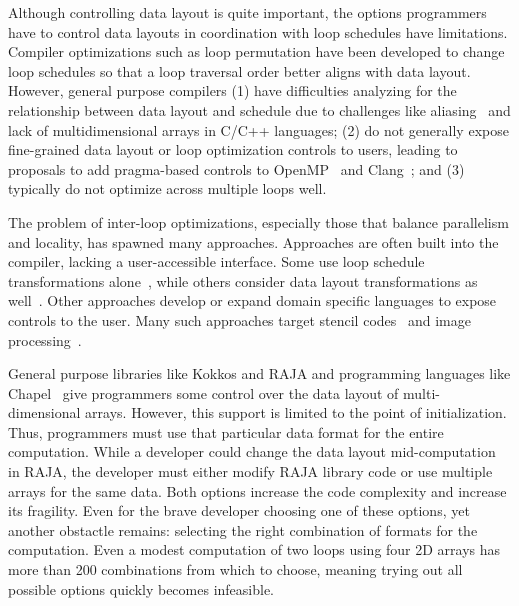 \documentclass[sigconf]{acmart}
\begin{document}
Although controlling data layout is quite important, the options programmers have to control
data layouts in coordination with loop schedules have limitations.
Compiler optimizations such as loop permutation have been developed to change loop
schedules so that a loop traversal order better aligns with data layout.
However, general purpose compilers 
(1) have difficulties analyzing for the relationship between
data layout and schedule due to challenges like aliasing~\cite{hind2001pointer} and lack of multidimensional arrays in 
C/C++ languages; 
(2) do not generally expose fine-grained data layout or loop optimization
controls to users, leading to proposals to add pragma-based controls to OpenMP~\cite{kruse2019design} and Clang~\cite{kruse2018user}; and 
(3) typically do not optimize across multiple loops well.

The problem of inter-loop optimizations, especially those that balance parallelism and locality, has spawned many approaches. 
Approaches are often built into the compiler, lacking a user-accessible interface.
Some use loop schedule transformations alone~\cite{wolf1991data,mckinley1996improving}, while others consider data layout transformations as well~\cite{cierniak1995unifying,kennedy1995automatic,kandemir1998improving,  chen2005constraint, chen2005integrating, ozturk2011data}.
Other approaches develop or expand domain specific languages to expose controls to the user.
Many such approaches target stencil codes~\cite{henretty2011data,kronawitter2018automatic,luporini2018design} and image processing~\cite{ragan-kelley2013halide,mullapudi2015polymage}.

General purpose libraries like Kokkos and RAJA and programming languages like Chapel~\cite{diaconescu2007approach} give programmers some control over the data layout of multi-dimensional arrays. However, this support is limited to the point of initialization.
Thus, programmers must use that particular data format for the entire computation.
While a developer could change the data layout mid-computation in RAJA, the developer must either modify RAJA library code or use multiple arrays for the same data. 
Both options increase the code complexity and increase its fragility.
Even for the brave developer choosing one of these options, yet another obstactle remains: selecting the right combination of formats for the computation.
Even a modest computation of two loops using four 2D arrays has more than 200 combinations from which to choose, meaning trying out all possible options quickly becomes infeasible. 
\end{document}
